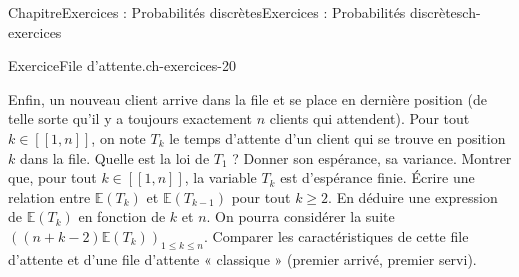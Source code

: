 \documentclass[twoside,10pt,]{book}
\numberwithin{equation}{chapter}
\newcommand{\Es}{\mathbb E}
\renewcommand\llbracket{[\![}
\renewcommand\rrbracket{]\!]}
\begin{document}
\begin{chapterptx}{Chapitre}{Exercices : Probabilités discrètes}{}{Exercices : Probabilités discrètes}{}{}{ch-exercices}
\begin{inlineexercise}{Exercice}{File d'attente.}{ch-exercices-20}
\begin{itemize}[label=\textbullet]
\end{itemize}
Enfin, un nouveau client arrive dans la file et se place en dernière position (de telle sorte qu'il y a toujours exactement \(n\) clients qui attendent). Pour tout \(k \in \llbracket 1, n \rrbracket\), on note \(T_{k}\) le temps d'attente d'un client qui se trouve en position \(k\) dans la file.%
Quelle est la loi de \(T_{1}\) ? Donner son espérance, sa variance.%
Montrer que, pour tout \(k \in \llbracket 1, n \rrbracket\), la variable \(T_{k}\) est d'espérance finie.%
Écrire une relation entre \(\Es(T_{k})\) et \(\Es(T_{k-1})\) pour tout \(k \geqslant 2\). En déduire une expression de \(\Es(T_{k})\) en fonction de \(k\) et \(n\). On pourra considérer la suite \(((n + k - 2) \Es(T_{k}))_{1 \leqslant k \leqslant n}\).%
Comparer les caractéristiques de cette file d'attente et d'une file d'attente « classique » (premier arrivé, premier servi).%
\end{inlineexercise}%
\end{chapterptx}
\end{document}
